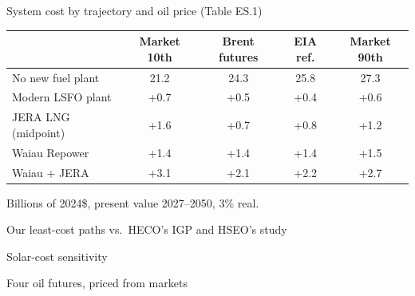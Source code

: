 \documentclass[11pt,aspectratio=169]{beamer}
\begin{document}
\begin{frame}{System cost by trajectory and oil price (Table ES.1)}
\begin{center}
\small
\renewcommand{\arraystretch}{1.25}
\begin{tabular}{lcccc}
\toprule
 & Market 10th & Brent futures & EIA ref. & Market 90th \\
\midrule
No new fuel plant       & 21.2 & 24.3 & 25.8 & 27.3 \\
Modern LSFO plant       & +0.7 & +0.5 & +0.4 & +0.6 \\
JERA LNG (midpoint)     & +1.6 & +0.7 & +0.8 & +1.2 \\
Waiau Repower           & +1.4 & +1.4 & +1.4 & +1.5 \\
Waiau + JERA            & +3.1 & +2.1 & +2.2 & +2.7 \\
\bottomrule
\end{tabular}

\vspace{0.3cm}
Billions of 2024\$, present value 2027--2050, 3\% real.
\end{center}
\end{frame}

\begin{frame}{Our least-cost paths vs.\ HECO's IGP and HSEO's study}
\end{frame}

\begin{frame}{Solar-cost sensitivity}
\end{frame}

\begin{frame}{Four oil futures, priced from markets}
\end{frame}

\backupend
\end{document}
